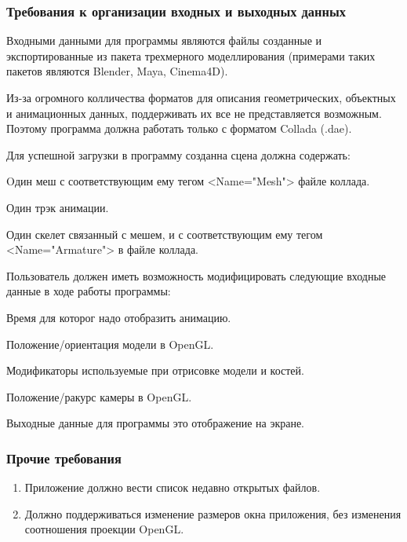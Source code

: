 \subsubsection{Требования к организации входных и выходных данных}
\begin{my_enumerate}
\item Входными данными для программы являются файлы  созданные и экспортированные из пакета трехмерного моделлирования (примерами таких пакетов являются Blender, Maya, Cinema4D).
\item Из-за огромного колличества форматов для описания геометрических, объектных и анимационных данных, поддерживать их все не представляется возможным. Поэтому программа должна работать только с форматом Collada (.dae).
\item Для успешной загрузки в программу созданна сцена должна содержать:
\begin{my_enumerate}
\item Oдин меш с соответствующим ему тегом <Name="Mesh"> файле коллада.
\item Один трэк анимации.
\item Один скелет связанный с мешем, и с соответствующим ему тегом <Name="Armature"> в файле коллада.
\end{my_enumerate}
\item Пользователь должен иметь возможность модифицировать следующие входные данные в ходе работы программы:
\begin{my_enumerate}
\item Время для которог надо отобразить анимацию.
\item Положение/ориентация модели в OpenGL.
\item Модификаторы используемые при отрисовке модели и костей.
\item Положение/ракурс камеры в OpenGL.
\end{my_enumerate}
\item Выходные данные для программы это отображение на экране.
\end{my_enumerate}

\subsubsection{Прочие требования}
\begin{enumerate}
\item Приложение должно вести список недавно открытых файлов.
\item Должно поддерживаться изменение размеров окна приложения, без изменения соотношения проекции OpenGL.
\end{enumerate}

